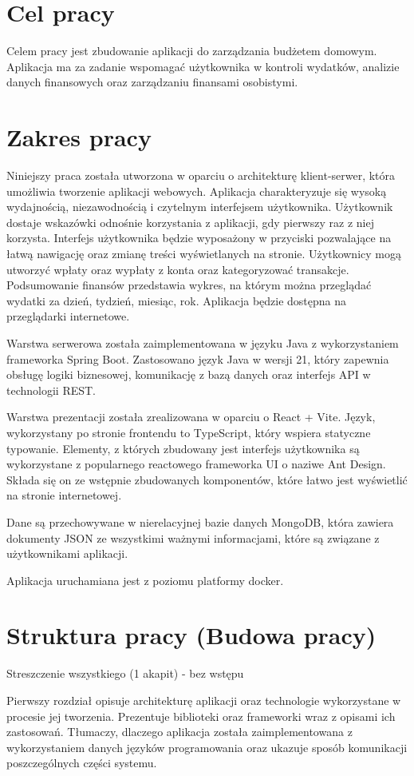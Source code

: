 \section{Cel pracy}
Celem pracy jest zbudowanie aplikacji do zarządzania budżetem domowym. Aplikacja ma za zadanie wspomagać użytkownika w kontroli wydatków, analizie danych finansowych oraz zarządzaniu finansami osobistymi.
\section{Zakres pracy}
Niniejszy praca została utworzona w oparciu o architekturę klient-serwer, która umożliwia tworzenie aplikacji webowych. Aplikacja charakteryzuje się wysoką wydajnością, niezawodnością i czytelnym interfejsem użytkownika. Użytkownik dostaje wskazówki odnośnie korzystania z aplikacji, gdy pierwszy raz z niej korzysta. Interfejs użytkownika będzie wyposażony w przyciski pozwalające na łatwą nawigację oraz zmianę treści wyświetlanych na stronie. Użytkownicy mogą utworzyć wpłaty oraz wypłaty z konta oraz kategoryzować transakcje. Podsumowanie finansów przedstawia wykres, na którym można przeglądać wydatki za dzień, tydzień, miesiąc, rok. Aplikacja będzie dostępna na przeglądarki internetowe.

Warstwa serwerowa została zaimplementowana w języku Java z wykorzystaniem frameworka Spring Boot. Zastosowano język Java w wersji 21, który zapewnia obsługę logiki biznesowej, komunikację z bazą danych oraz interfejs API w technologii REST.

Warstwa prezentacji została zrealizowana w oparciu o React + Vite. Język, wykorzystany po stronie frontendu to TypeScript, który wspiera statyczne typowanie.  Elementy, z których zbudowany jest interfejs użytkownika są wykorzystane z popularnego reactowego frameworka UI o naziwe Ant Design. Składa się on ze wstępnie zbudowanych komponentów, które łatwo jest wyświetlić na stronie internetowej.

Dane są przechowywane w nierelacyjnej bazie danych MongoDB, która zawiera dokumenty JSON ze wszystkimi ważnymi informacjami, które są związane z użytkownikami aplikacji.

Aplikacja uruchamiana jest z poziomu platformy docker.
\section{Struktura pracy (Budowa pracy)}
Streszczenie wszystkiego (1 akapit) - bez wstępu 

Pierwszy rozdział opisuje architekturę aplikacji oraz technologie wykorzystane w procesie jej tworzenia. Prezentuje biblioteki oraz frameworki wraz z opisami ich zastosowań. Tłumaczy, dlaczego aplikacja została zaimplementowana z wykorzystaniem danych języków programowania oraz ukazuje sposób komunikacji poszczególnych części systemu.

